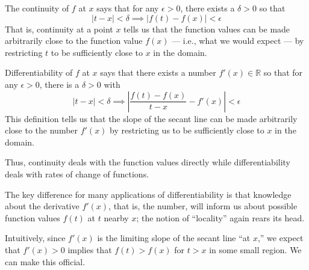 The continuity of $f$ at $x$ says that for any $\epsilon > 0$, there exists a $\delta > 0$ so that $$ \left| t-  x\right| < \delta  \implies \left| f\left(t\right) - f\left(x\right) \right| < \epsilon $$ That is, continuity at a point $x$ tells us that the function values can be made arbitrarily close to the function value $f\left(x\right)$ --- i.e., what we would expect --- by restricting $t$ to be sufficiently close to $x$ in the domain.

Differentiability of $f$ at $x$ says that there exists a number $f'\left(x\right) \in \mathbb{R}$ so that for any $\epsilon > 0$, there is a $\delta > 0 $ with $$ \left| t-  x\right| < \delta  \implies \left| \frac{f\left(t\right) - f\left(x\right)}{t-x} - f'\left(x\right) \right| < \epsilon $$ This definition tells us that the slope of the secant line can be made arbitrarily close to the number $f'\left(x\right)$ by restricting us to be sufficiently close to $x$ in the domain.

Thus, continuity deals with the function values directly while differentiability deals with rates of change of functions. 

The key difference for many applications of differentiability is that knowledge about the derivative $f'\left(x\right)$, that is, the number, will inform us about possible function values $f\left(t\right)$ at $t$ nearby $x$; the notion of ``locality'' again rears its head.

Intuitively, since $f'\left(x\right)$ is the limiting slope of the secant line ``at $x$,'' we expect that $f'\left(x\right)>0$ implies that $f\left(t\right) > f\left(x\right)$ for $t > x$ in some small region. We can make this official.

